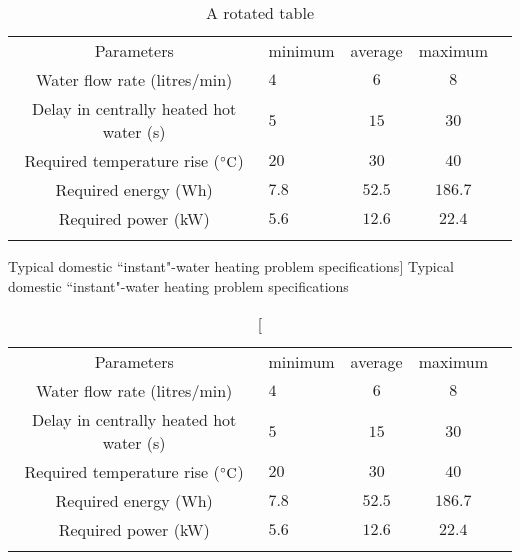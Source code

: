 \begin{sidewaystable}
  \centering
  \caption{A rotated table}
  	\begin{tabular}{clccc}
		\tableDline
		Parameters                            & minimum & average & maximum \\
		\tableline
		Water flow rate (litres/min)            & $4$   & $6$     & $8$  \\
		Delay in centrally heated hot water (s) & $5$   & $15$    & $30 $ \\ 
		Required temperature rise ($\mbox{$\hbox{$^\circ$}$\rm{C}}$)     & $20$  & $30$    & $40$  \\ 
		Required energy (Wh)                    & $7.8$ & $52.5$  & $186.7$  \\
		Required power (kW)                     & $5.6$ & $12.6$  & $22.4$  \\  
			\tableDline
		\end{tabular}
  \label{tab:test}
\end{sidewaystable}

\begin{table}[t]
	\centering
	\caption[Typical domestic ``instant"-water heating problem specifications]
	{Typical domestic ``instant"-water heating problem specifications}
	\label{ta:SCATMA_for_LWH}
	\begin{tabular}{clccc}
		\tableDline
		Parameters                            & minimum & average & maximum \\
		\tableline
		Water flow rate (litres/min)            & $4$   & $6$     & $8$  \\
		Delay in centrally heated hot water (s) & $5$   & $15$    & $30 $ \\ 
		Required temperature rise ($\mbox{$\hbox{$^\circ$}$\rm{C}}$)     & $20$  & $30$    & $40$  \\ 
		Required energy (Wh)                    & $7.8$ & $52.5$  & $186.7$  \\
		Required power (kW)                     & $5.6$ & $12.6$  & $22.4$  \\  
			\tableDline
		\end{tabular}
	\end{table}














